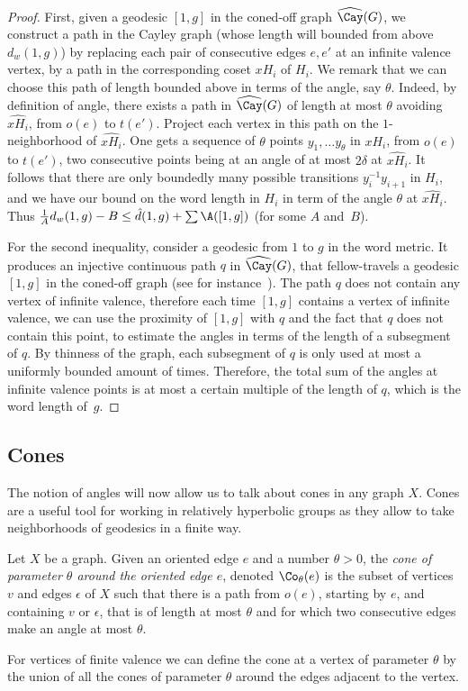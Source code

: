 \begin{proof}
First, given a geodesic $[1,g]$ in the coned-off graph $\widehat{{\Cay}} (G)$, we construct a path in the Cayley graph (whose length will bounded from above $d_w(1,g)$) by replacing each pair of consecutive edges $e,e'$ at an infinite valence vertex, by a path in the corresponding coset $xH_i$ of $H_i$. We remark that we can choose this path of length bounded above in terms of the angle, say $\theta$. Indeed, by definition of angle, there exists a path in $\widehat{{\Cay}} (G)$ of length at most $\theta$ avoiding $\widehat{xH_i}$, from $o(e)$ to $t(e')$. Project each vertex in this path on the $1$-neighborhood of $\widehat{xH_i}$. One gets a sequence of $\theta$ points $y_1, \dots y_\theta$ in $xH_i$, from $o(e)$ to $t(e')$, two consecutive points being at an angle of at most $2\delta$ at $\widehat{xH_i}$. It follows that there are only boundedly many possible transitions $y_i^{-1}y_{i+1}$ in $H_i$, and we have our bound on the word length in $H_i$ in term of the angle $\theta$ at $\widehat{xH_i}$. Thus $ \frac1A d_w(1,g) -B \leq \hat{d}(1,g) + \sum\A ([1,g]) $ (for some $A$ and~$B$).

For the second inequality, consider a geodesic from $1$ to $g$ in the word metric. It produces an injective continuous path $q$ in $\widehat{{\Cay}} (G)$, that fellow-travels a geodesic $[1,g]$ in the coned-off graph (see for instance~\cite[Prop.~8.25]{DS}). The path $q$ does not contain any vertex of infinite valence, therefore each time $[1,g]$ contains a vertex of infinite valence, we can use the proximity of $[1,g]$ with $q$ and the fact that $q$ does not contain this point, to estimate the angles in terms of the length of a subsegment of $q$. By thinness of the graph, each subsegment of $q$ is only used at most a uniformly bounded amount of times. Therefore, the total sum of the angles at infinite valence points is at most a certain multiple of the length of $q$, which is the word length of~$g$.
\end{proof}

\subsection{Cones}
The notion of angles will now allow us to talk about cones in any graph $X$. Cones are a useful tool for working in relatively hyperbolic groups as they allow to take neighborhoods of geodesics in a finite way.

\begin{defi}
Let $X$ be a graph. Given an oriented edge $e$ and a number $\theta>0$, the \emph{cone of parameter $\theta$ around the oriented edge $e$}, denoted $\Co_{\theta}(e)$ is the subset of vertices $v$ and edges $\epsilon$ of $X$ such that there is a path from $o(e)$, starting by $e$, and containing $v$ or $\epsilon$, that is of length at most $\theta$ and for which two consecutive edges make an angle at most $\theta$.

For vertices of finite valence we can define the cone at a vertex of parameter $\theta$ by the union of all the cones of parameter $\theta$ around the edges adjacent to the vertex.
\end{defi}

